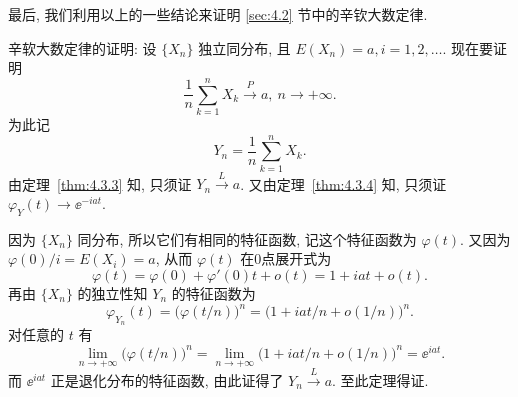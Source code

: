 最后, 我们利用以上的一些结论来证明 \ref{sec:4.2} 节中的辛钦大数定律.

{\heiti 辛软大数定律的证明}:
设 $ \{ X_n \} $ 独立同分布, 且 $ E (X_n) = a, i=1, 2, \dotsc $.
现在要证明
\begin{equation*}
    \frac{1}{n} \sum_{k=1}^n X_k \stackrel{P}{\to} a, \ n \to +\infty.
\end{equation*}
为此记
\begin{equation*}
    Y_n = \frac{1}{n} \sum_{k=1}^n X_k.
\end{equation*}
由定理~\ref{thm:4.3.3} 知, 只须证 $ Y_n \stackrel{L}{\to} a $.
又由定理~\ref{thm:4.3.4} 知, 只须证 $ \varphi_Y (t) \to \ee^{-iat} $.

因为 $ \{ X_n \} $ 同分布, 所以它们有相同的特征函数, 记这个特征函数为 $ \varphi (t) $.
又因为 $ \varphi(0) / i = E ( X_i ) = a $, 从而 $ \varphi (t) $ 在0点展开式为
\begin{equation*}
    \varphi (t) = \varphi (0) + \varphi' (0) t + o (t) = 1 + iat + o (t).
\end{equation*}
再由 $ \{ X_n \} $ 的独立性知 $ Y_n $ 的特征函数为
\begin{equation*}
    \varphi_{Y_n} (t) = \bigl( \varphi ( t / n) \bigr)^n = \bigl( 1 + iat/n + o (1/n) \bigr)^n.
\end{equation*}
对任意的 $ t $ 有
\begin{equation*}
    \lim_{n \to +\infty} \bigl( \varphi ( t / n) \bigr)^n = \lim_{n \to +\infty} \bigl( 1 + iat/n + o (1/n) \bigr)^n = \ee^{iat}.
\end{equation*}
而 $ \ee^{iat} $ 正是退化分布的特征函数, 由此证得了 $ Y_n \stackrel{L}{\to} a $.
至此定理得证.

